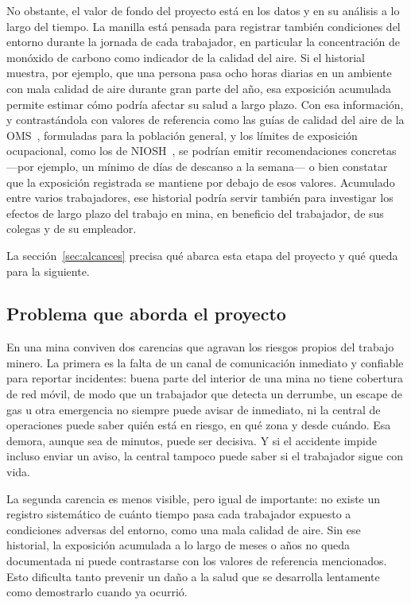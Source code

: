 \documentclass[10pt,a4paper]{article}
\begin{document}
No obstante, el valor de fondo del proyecto está en los datos y en su análisis a lo largo del tiempo. La manilla está pensada para registrar también condiciones del entorno durante la jornada de cada trabajador, en particular la concentración de monóxido de carbono como indicador de la calidad del aire. Si el historial muestra, por ejemplo, que una persona pasa ocho horas diarias en un ambiente con mala calidad de aire durante gran parte del año, esa exposición acumulada permite estimar cómo podría afectar su salud a largo plazo. Con esa información, y contrastándola con valores de referencia como las guías de calidad del aire de la OMS~\cite{oms}, formuladas para la población general, y los límites de exposición ocupacional, como los de NIOSH~\cite{niosh}, se podrían emitir recomendaciones concretas —por ejemplo, un mínimo de días de descanso a la semana— o bien constatar que la exposición registrada se mantiene por debajo de esos valores. Acumulado entre varios trabajadores, ese historial podría servir también para investigar los efectos de largo plazo del trabajo en mina, en beneficio del trabajador, de sus colegas y de su empleador.

La sección~\ref{sec:alcances} precisa qué abarca esta etapa del proyecto y qué queda para la siguiente.

\subsection{Problema que aborda el proyecto}
En una mina conviven dos carencias que agravan los riesgos propios del trabajo minero. La primera es la falta de un canal de comunicación inmediato y confiable para reportar incidentes: buena parte del interior de una mina no tiene cobertura de red móvil, de modo que un trabajador que detecta un derrumbe, un escape de gas u otra emergencia no siempre puede avisar de inmediato, ni la central de operaciones puede saber quién está en riesgo, en qué zona y desde cuándo. Esa demora, aunque sea de minutos, puede ser decisiva. Y si el accidente impide incluso enviar un aviso, la central tampoco puede saber si el trabajador sigue con vida.

La segunda carencia es menos visible, pero igual de importante: no existe un registro sistemático de cuánto tiempo pasa cada trabajador expuesto a condiciones adversas del entorno, como una mala calidad de aire. Sin ese historial, la exposición acumulada a lo largo de meses o años no queda documentada ni puede contrastarse con los valores de referencia mencionados. Esto dificulta tanto prevenir un daño a la salud que se desarrolla lentamente como demostrarlo cuando ya ocurrió.
\end{document}
